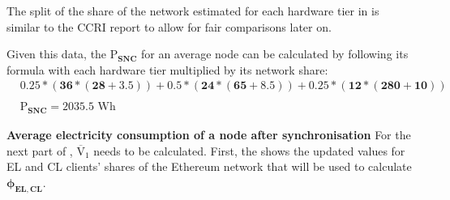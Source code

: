 The split of the share of the network estimated for each hardware tier in  is similar to the CCRI report \cite{CryptoCarbonRatingsInstitute2022TheNetwork} to allow for fair comparisons later on. 

Given this data, the $\boldsymbol{\mathrm{P}_{SNC}}$ for an average node can be calculated by following its formula with each hardware tier multiplied by its network share: \newline
\begin{align}
    &\boldsymbol{0.25*(36*(28 + 3.5)) + 0.5*(24*(65+8.5)) + 0.25*(12*(280+10))} \nonumber\\ \nonumber \\
    &\boldsymbol{{\mathrm{P}_{SNC}} = 2035.5} \text{ Wh} \nonumber
\end{align}



\textbf{Average electricity consumption of a node after synchronisation}
\label{postSyncEnergyImplementation}
For the next part of , $\boldsymbol{\mathrm{\overline{V}_{1}}}$ needs to be calculated. First, the  shows the updated values for EL and CL clients' shares of the Ethereum network that will be used to calculate $\boldsymbol{\phi_{EL,CL}}$.  


